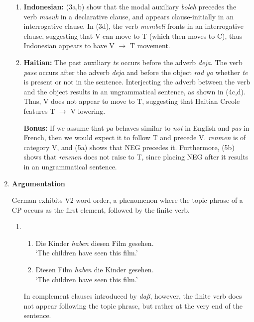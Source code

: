 \documentclass[12pt]{article}
\begin{document}
\begin{enumerate}[label=\textbf{\arabic*.}]
\begin{enumerate}[label=(\alph*)]
	\item \textbf{Indonesian:} (3a,b) show that the modal auxiliary \emph{boleh} precedes the verb \emph{masuk}
	in a declarative clause, and appears clause-initially in an interrogative clause. In (3d), the verb
	\emph{membeli} fronts in an interrogative clause, suggesting that V can move to T (which then moves to C),
	thus Indonesian appears to have V $\rightarrow$ T movement.

	\item \textbf{Haitian:} The past auxiliary \emph{te} occurs before the adverb \emph{deja}. The verb
	\emph{pase} occurs after the adverb \emph{deja} and before the object \emph{rad yo} whether \emph{te}
	is present or not in the sentence. Interjecting the adverb between the verb and the object results in 
	an ungrammatical sentence, as shown in (4c,d). Thus, V does not appear to move to T, suggesting that
	Haitian Creole features T $\rightarrow$ V lowering.

	\textbf{Bonus:} If we assume that \emph{pa} behaves similar to \emph{not} in English and \emph{pas} in
	French, then we would expect it to follow T and precede V. \emph{renmen} is of category V, and (5a) shows
	that NEG precedes it. Furthermore, (5b) shows that \emph{renmen} does not raise to T, since placing NEG
	after it results in an ungrammatical sentence.
	\end{enumerate}

\item \textbf{Argumentation}
	
	German exhibits V2 word order, a phenomenon where the topic phrase of a CP occurs as the first element,
	followed by the finite verb.

	\begin{enumerate}[label=(\arabic*)]
		\item
		\begin{enumerate}[label=\alph*.]
		\item Die Kinder \emph{haben} diesen Film gesehen.\\
		`The children have seen this film.'
		\item Diesen Film \emph{haben} die Kinder gesehen.\\
		`The children have seen this film.'
		\end{enumerate}

	In complement clauses introduced by \emph{daß}, however, the finite verb does not appear following
	the topic phrase, but rather at the very end of the sentence.


\end{enumerate}
\end{enumerate}
\end{document}
